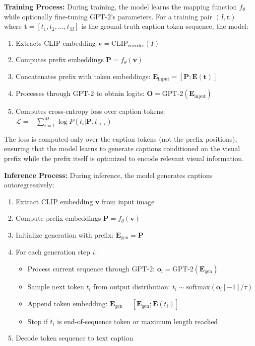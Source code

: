 \documentclass[runningheads]{llncs}
\begin{document}
\textbf{Training Process:} During training, the model learns the mapping function $f_\theta$ while optionally fine-tuning GPT-2's parameters. For a training pair $(I, \mathbf{t})$ where $\mathbf{t} = [t_1, t_2, \ldots, t_M]$ is the ground-truth caption token sequence, the model:
\begin{enumerate}
\item Extracts CLIP embedding $\mathbf{v} = \text{CLIP}_{\text{encoder}}(I)$
\item Computes prefix embeddings $\mathbf{P} = f_\theta(\mathbf{v})$
\item Concatenates prefix with token embeddings: $\mathbf{E}_{\text{input}} = [\mathbf{P}; \mathbf{E}(\mathbf{t})]$
\item Processes through GPT-2 to obtain logits: $\mathbf{O} = \text{GPT-2}(\mathbf{E}_{\text{input}})$
\item Computes cross-entropy loss over caption tokens: $\mathcal{L} = -\sum_{i=1}^{M} \log P(t_i | \mathbf{P}, t_{<i})$
\end{enumerate}

The loss is computed only over the caption tokens (not the prefix positions), ensuring that the model learns to generate captions conditioned on the visual prefix while the prefix itself is optimized to encode relevant visual information.

\textbf{Inference Process:} During inference, the model generates captions autoregressively:
\begin{enumerate}
\item Extract CLIP embedding $\mathbf{v}$ from input image
\item Compute prefix embeddings $\mathbf{P} = f_\theta(\mathbf{v})$
\item Initialize generation with prefix: $\mathbf{E}_{\text{gen}} = \mathbf{P}$
\item For each generation step $i$:
  \begin{itemize}
  \item Process current sequence through GPT-2: $\mathbf{o}_i = \text{GPT-2}(\mathbf{E}_{\text{gen}})$
  \item Sample next token $t_i$ from output distribution: $t_i \sim \text{softmax}(\mathbf{o}_i[-1] / \tau)$
  \item Append token embedding: $\mathbf{E}_{\text{gen}} = [\mathbf{E}_{\text{gen}}; \mathbf{E}(t_i)]$
  \item Stop if $t_i$ is end-of-sequence token or maximum length reached
  \end{itemize}
\item Decode token sequence to text caption
\end{enumerate}
\end{document}
